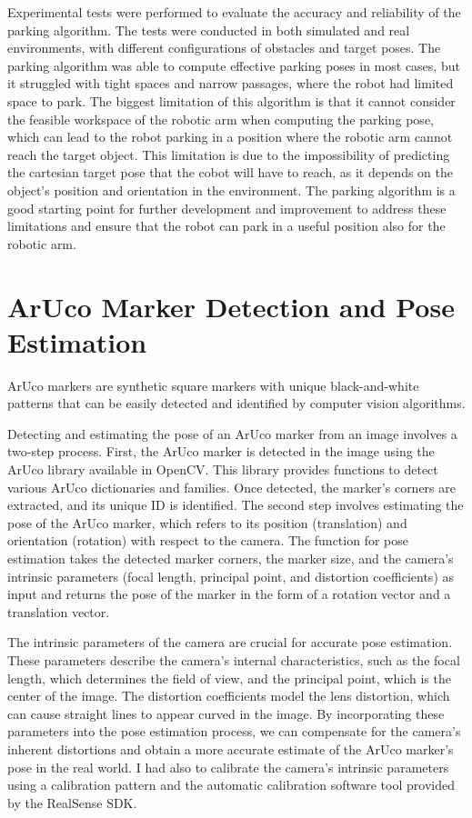 Experimental tests were performed to evaluate the accuracy and reliability of the parking algorithm.
The tests were conducted in both simulated and real environments, with different configurations of obstacles
and target poses. The parking algorithm was able to compute effective parking poses in most cases,
but it struggled with tight spaces and narrow passages, where the robot had limited space to park.
The biggest limitation of this algorithm is that it cannot consider the feasible workspace of the robotic arm
when computing the parking pose, which can lead to the robot parking in a position where the robotic arm
cannot reach the target object. This limitation is due to the impossibility of predicting the cartesian
target pose that the cobot will have to reach, as it depends on the object's position and orientation
in the environment. The parking algorithm is a good starting point for further development and improvement
to address these limitations and ensure that the robot can park in a useful position also for the robotic arm.

\section{ArUco Marker Detection and Pose Estimation}

ArUco markers are synthetic square markers with unique black-and-white patterns that can be easily detected
and identified by computer vision algorithms.

Detecting and estimating the pose of an ArUco marker from an image involves a two-step process.
First, the ArUco marker is detected in the image using the ArUco library available in OpenCV. 
This library provides functions to detect various ArUco dictionaries and families. 
Once detected, the marker's corners are extracted, and its unique ID is identified. 
The second step involves estimating the pose of the ArUco marker, which refers to its position 
(translation) and orientation (rotation) with respect to the camera. The function for pose estimation 
takes the detected marker corners, the marker size, and the camera's intrinsic parameters (focal length,
principal point, and distortion coefficients) as input and returns the pose of the marker in the form of a rotation
vector and a translation vector.

The intrinsic parameters of the camera are crucial for accurate pose estimation. These parameters describe the camera's
internal characteristics, such as the focal length, which determines the field of view, and the principal point,
which is the center of the image. The distortion coefficients model the lens distortion, which can cause straight
lines to appear curved in the image. By incorporating these parameters into the pose estimation process,
we can compensate for the camera's inherent distortions and obtain a more accurate estimate of the ArUco marker's pose
in the real world. I had also to calibrate the camera's intrinsic parameters using a calibration pattern and the
automatic calibration software tool provided by the RealSense SDK.

